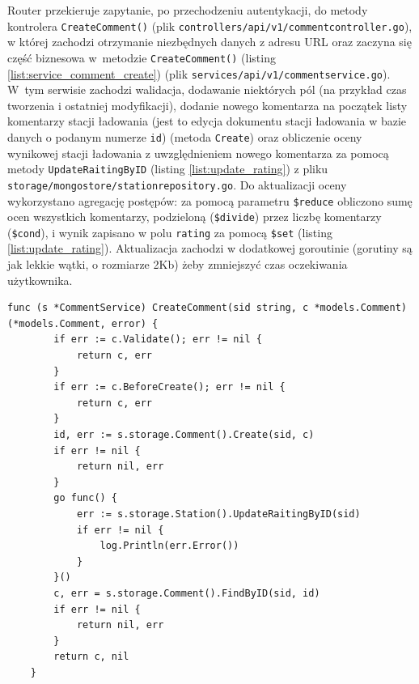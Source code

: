 Router przekieruje zapytanie, po przechodzeniu autentykacji, do metody kontrolera \texttt{CreateComment()} (plik \texttt{controllers/api/v1/commentcontroller.go}), w której zachodzi otrzymanie niezbędnych danych z adresu URL oraz zaczyna się część biznesowa w~metodzie \texttt{CreateComment()} (listing \ref{list:service_comment_create}) (plik \texttt{services/api/v1/commentservice.go}).
W~tym serwisie zachodzi walidacja, dodawanie niektórych pól (na przykład czas tworzenia i ostatniej modyfikacji), dodanie nowego komentarza na początek listy komentarzy stacji ładowania (jest to edycja dokumentu stacji ładowania w bazie danych o podanym numerze \texttt{id}) (metoda \texttt{Create}) oraz obliczenie oceny wynikowej stacji ładowania z uwzględnieniem nowego komentarza za pomocą metody \texttt{UpdateRaitingByID} (listing \ref{list:update_rating}) z pliku \texttt{storage/mongostore/stationrepository.go}.
Do aktualizacji oceny wykorzystano agregację postępów: za pomocą parametru \texttt{\$reduce} obliczono sumę ocen wszystkich komentarzy, podzieloną (\texttt{\$divide}) przez liczbę komentarzy (\texttt{\$cond}), i wynik zapisano w polu \texttt{rating} za pomocą \texttt{\$set} (listing \ref{list:update_rating}). Aktualizacja zachodzi w dodatkowej goroutinie (gorutiny są jak lekkie wątki, o rozmiarze 2Kb) żeby zmniejszyć czas oczekiwania użytkownika.


\begin{lstlisting}[label=list:service_comment_create,caption=Serwis tworzenia komentarza,basicstyle=\tiny\ttfamily]
    func (s *CommentService) CreateComment(sid string, c *models.Comment) (*models.Comment, error) {
        if err := c.Validate(); err != nil {
            return c, err
        }
        if err := c.BeforeCreate(); err != nil {
            return c, err
        }
        id, err := s.storage.Comment().Create(sid, c)
        if err != nil {
            return nil, err
        }
        go func() {
            err := s.storage.Station().UpdateRaitingByID(sid)
            if err != nil {
                log.Println(err.Error())
            }
        }()
        c, err = s.storage.Comment().FindByID(sid, id)
        if err != nil {
            return nil, err
        }
        return c, nil
    }
\end{lstlisting}
    
